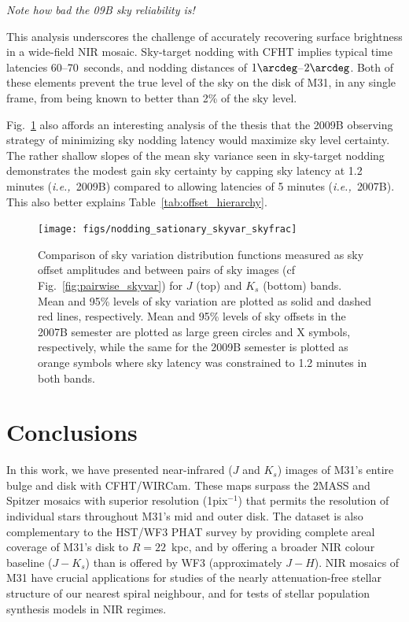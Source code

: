 \documentclass[iop]{emulateapj}
\newcommand{\ie}{\textit{i.e.,~}}
\newcommand{\mycomment}[1]{\textcolor{OliveGreen}{\textit{#1}}} %
\newcommand{\Fig}[1]{Fig.~\ref{fig:#1}}  %
\newcommand{\Tab}[1]{Table~\ref{tab:#1}}  %
\begin{document}
\mycomment{Note how bad the 09B sky reliability is!}

This analysis underscores the challenge of accurately recovering surface brightness in a wide-field NIR mosaic.
Sky-target nodding with CFHT implies typical time latencies 60--70~seconds, and nodding distances of $1\arcdeg$--$2\arcdeg$.
Both of these elements prevent the true level of the sky on the disk of M31, in any single frame, from being known to better than 2\% of the sky level.

\Fig{nodding_stationary_skyvar_skyfrac} also affords an interesting analysis of the thesis that the 2009B observing strategy of minimizing sky nodding latency would maximize sky level certainty.
The rather shallow slopes of the mean sky variance seen in sky-target nodding demonstrates the modest gain sky certainty by capping sky latency at 1.2 minutes (\ie 2009B) compared to allowing latencies of 5 minutes (\ie 2007B).
This also better explains \Tab{offset_hierarchy}.

\begin{figure}[t]
\centering
\texttt{[image: figs/nodding\_sationary\_skyvar\_skyfrac]}
\caption{Comparison of sky variation distribution functions measured as sky offset amplitudes and between pairs of sky images (cf \Fig{pairwise_skyvar}) for $J$ (top) and $K_s$ (bottom) bands.
Mean and 95\% levels of sky variation are plotted as solid and dashed red lines, respectively.
Mean and 95\% levels of sky offsets in the 2007B semester are plotted as large green circles and X symbols, respectively, while the same for the 2009B semester is plotted as orange symbols where sky latency was constrained to 1.2 minutes in both bands.}
\label{fig:nodding_stationary_skyvar_skyfrac}
\end{figure}


\section{Conclusions}
\label{sec:conclusions}

In this work, we have presented near-infrared ($J$ and $K_s$) images of M31's entire bulge and disk with CFHT/WIRCam. These maps surpass the 2MASS \citep{Beaton:2007} and Spitzer \citep{Barmby:2006} mosaics with superior resolution (1\arcsec pix$^{-1}$) that permits the resolution of individual stars throughout M31's mid and outer disk. The dataset is also complementary to the HST/WF3 PHAT survey \citep{Dalcanton:2012} by providing complete areal coverage of M31's disk to $R=22$~kpc, and by offering a broader NIR colour baseline ($J-K_s$) than is offered by WF3 (approximately  $J-H$). NIR mosaics of M31 have crucial applications for studies of the nearly attenuation-free stellar structure of our nearest spiral neighbour, and for tests of stellar population synthesis models in NIR regimes.
\end{document}
